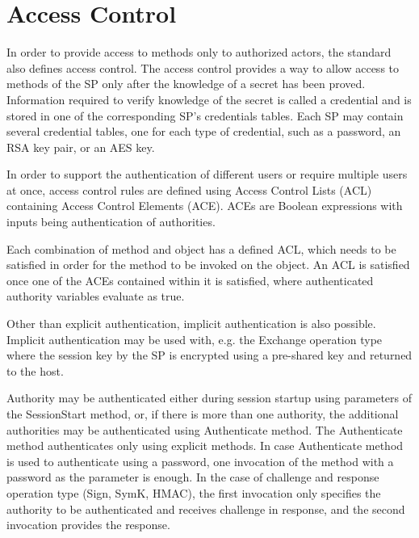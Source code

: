 
\section{Access Control}

In order to provide access to methods only to authorized actors, the standard also defines access control. The access control provides a way to allow access to methods of the SP only after the knowledge of a secret has been proved. Information required to verify knowledge of the secret is called a credential and is stored in one of the corresponding SP's credentials tables. Each SP may contain several credential tables, one for each type of credential, such as a password,  an RSA key pair, or an AES key.

In order to support the authentication of different users or require multiple users at once, access control rules are defined using Access Control Lists (ACL) containing Access Control Elements (ACE). ACEs are Boolean expressions with inputs being authentication of authorities.

Each combination of method and object has a defined ACL, which needs to be satisfied in order for the method to be invoked on the object. An ACL is satisfied once one of the ACEs contained within it is satisfied, where authenticated authority variables evaluate as true.




Other than explicit authentication, implicit authentication is also possible. Implicit authentication may be used with, e.g. the Exchange operation type where the session key by the SP is encrypted using a pre-shared key and returned to the host.

Authority may be authenticated either during session startup using parameters of the SessionStart method, or, if there is more than one authority, the additional authorities may be authenticated using Authenticate method. 
The Authenticate method authenticates only using explicit methods. 
In case Authenticate method is used to authenticate using a password, one invocation of the method with a password as the parameter is enough. In the case of challenge and response operation type (Sign, SymK, HMAC), the first invocation only specifies the authority to be authenticated and receives challenge in response, and the second invocation provides the response.

